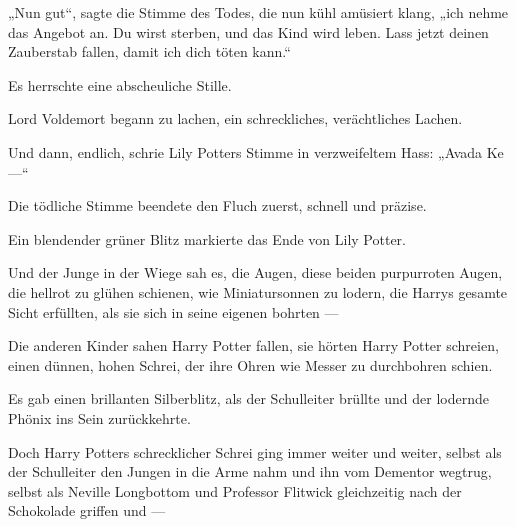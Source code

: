 \begin{em}
„Nun gut“, sagte die Stimme des Todes, die nun kühl amüsiert klang, „ich nehme das Angebot an. Du wirst sterben, und das Kind wird leben. Lass jetzt deinen Zauberstab fallen, damit ich dich töten kann.“

Es herrschte eine abscheuliche Stille.

Lord Voldemort begann zu lachen, ein schreckliches, verächtliches Lachen.

Und dann, endlich, schrie Lily Potters Stimme in verzweifeltem Hass: „Avada Ke—“

Die tödliche Stimme beendete den Fluch zuerst, schnell und präzise.


Ein blendender grüner Blitz markierte das Ende von Lily Potter.

Und der Junge in der Wiege sah es, die Augen, diese beiden purpurroten Augen, die hellrot zu glühen schienen, wie Miniatursonnen zu lodern, die Harrys gesamte Sicht erfüllten, als sie sich in seine eigenen bohrten —
\end{em}

\later

Die anderen Kinder sahen Harry Potter fallen, sie hörten Harry Potter schreien, einen dünnen, hohen Schrei, der ihre Ohren wie Messer zu durchbohren schien.

Es gab einen brillanten Silberblitz, als der Schulleiter  brüllte und der lodernde Phönix ins Sein zurückkehrte.

Doch Harry Potters schrecklicher Schrei ging immer weiter und weiter, selbst als der Schulleiter den Jungen in die Arme nahm und ihn vom Dementor wegtrug, selbst als Neville Longbottom und Professor Flitwick gleichzeitig nach der Schokolade griffen und —

